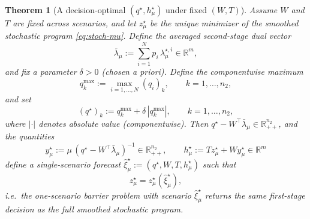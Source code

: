 \documentclass[11pt]{article}
\theoremstyle{plain}
\newtheorem{theorem}{Theorem}[section]
\theoremstyle{definition}
\theoremstyle{remark}
\begin{document}
\begin{theorem}[A decision-optimal $(q^\star,h_\mu^\star)$ under fixed $(W,T)$]\label{thm:qh-fixedWT-barrier}
Assume $W$ and $T$ are fixed across scenarios, and let $z_\mu^\star$ be the unique minimizer of the smoothed
stochastic program \eqref{eq:stoch-mu}. Define the averaged second-stage dual vector
\[
\bar\lambda_\mu:=\sum_{i=1}^N p_i\,\lambda_{\mu}^{\star,i}\in\mathbb{R}^m,
\]
and fix a parameter $\delta>0$ (chosen a priori). Define the componentwise maximum
\[
q^{\max}_k:=\max_{i=1,\dots,N}(q_i)_k,\qquad k=1,\dots,n_2,
\]
and set
\begin{equation}\label{eq:qmax}
(q^\star)_k:= q^{\max}_k + \delta\,|q^{\max}_k|,\qquad k=1,\dots,n_2,
\end{equation}
where $|\cdot|$ denotes absolute value (componentwise).
Then $q^\star-W^\top\bar\lambda_\mu\in\mathbb{R}^{n_2}_{++}$, and the quantities
\[
y_\mu^\star:=\mu\,(q^\star-W^\top\bar\lambda_\mu)^{-1}\in\mathbb{R}^{n_2}_{++},
\qquad
h_\mu^\star:=Tz_\mu^\star+Wy_\mu^\star\in\mathbb{R}^m
\]
define a single-scenario forecast $\hat\xi_\mu^\star:=(q^\star,W,T,h_\mu^\star)$ such that
\begin{equation}\label{eq:decision-optimal-qh}
z_\mu^\star = z_\mu^\star(\hat\xi_\mu^\star),
\end{equation}
i.e.\ the one-scenario barrier problem with scenario $\hat\xi_\mu^\star$ returns the same first-stage decision
as the full smoothed stochastic program.
\end{theorem}
\end{document}
